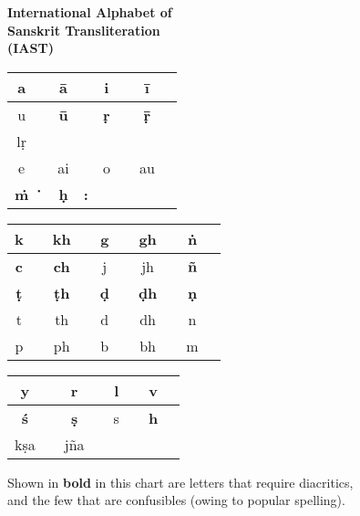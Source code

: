 \thispagestyle{empty}
\begin{center}
{\LARGE\bfseries International Alphabet of\\[3pt] Sanskrit Transliteration\\[8pt] (IAST)}
\vskip 30pt

\bgroup
\fontsize{11}{14pt}\selectfont
\renewcommand{\arraystretch}{1.5}
\begin{tabular}{|c|c!{\vrule width 0.8pt}c|c!{\vrule width 0.8pt}c|c!{\vrule width 0.8pt}c|c|}
\hline
a &  & {\bf ā} &  & i &  & {\bf ī} & \\
\hline
u &      & {\bf ū} &  & {\bf ṛ} &  & {\bf ṝ} &  \\
\hline
lṛ &    &     &                       &     &                       &      & \\
\hline
e &  & ai &  & o &  & au & \\
\hline
{\bf ṁ} &  {\bf‍\.{\phantom{i}}}  & {\bf ḥ}  & {\bf :}         &   &            &   & \\  	
\hline
\end{tabular}
\vskip 20pt

\begin{tabular}{|c|c!{\vrule width 0.8pt}c|c!{\vrule width 0.8pt}c|c!{\vrule width 0.8pt}c|c!{\vrule width 0.8pt}c|c|}
\hline
k &  & kh &  & g &  & gh &  & {\bf ṅ} & \\
\hline
{\bf c} &  & {\bf ch} &  & j &  & jh &   & {\bf ñ} &  \\
\hline
{\bf ṭ} &  & {\bf ṭh} &  & {\bf ḍ} &   & {\bf ḍh} &  & {\bf ṇ} &   \\
\hline
t &   & th &   & d &  & dh &   & n &  \\
\hline
p &  & ph &  & b &  & bh &   & m &  \\ 
\hline
\end{tabular}
\vskip 20pt

\begin{tabular}{|c|c!{\vrule width 0.8pt}c|c!{\vrule width 0.8pt}c|c!{\vrule width 0.8pt}c|c|}
\hline
y &      & r   &  & l &  & v &  \\
\hline
{\bf ś} &    & {\bf ṣ}   &  & s &  & {\bf h} &  \\
\hline
kṣa &  & jña &  &    &    &   &  \\
\hline
\end{tabular}
\egroup
\end{center}

\begin{center}
Shown in \textbf{bold} in this chart are letters that require diacritics,\\ and the few that are confusibles (owing to popular spelling).
\end{center}
